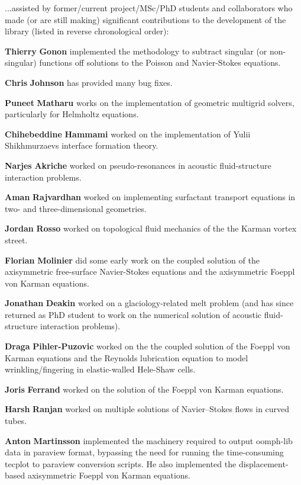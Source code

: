 ...assisted by former/current project/\+M\+Sc/\+PhD students and collaborators who made (or are still making) significant contributions to the development of the library (listed in reverse chronological order)\+:
\begin{DoxyItemize}
\item {\bfseries Thierry} {\bfseries Gonon} implemented the methodology to subtract singular (or non-\/singular) functions off solutions to the Poisson and Navier-\/\+Stokes equations.
\item {\bfseries Chris} {\bfseries Johnson} has provided many bug fixes.
\item {\bfseries Puneet} {\bfseries Matharu} works on the implementation of geometric multigrid solvers, particularly for Helmholtz equations.
\item {\bfseries Chihebeddine} {\bfseries Hammami} worked on the implementation of Yulii Shikhmurzaev\textquotesingle{}s interface formation theory.
\item {\bfseries Narjes} {\bfseries Akriche} worked on pseudo-\/resonances in acoustic fluid-\/structure interaction problems.
\item {\bfseries Aman} {\bfseries Rajvardhan} worked on implementing surfactant transport equations in two-\/ and three-\/dimensional geometries.
\item {\bfseries Jordan} {\bfseries Rosso} worked on topological fluid mechanics of the the Karman vortex street.
\item {\bfseries Florian} {\bfseries Molinier} did some early work on the coupled solution of the axisymmetric free-\/surface Navier-\/\+Stokes equations and the axisymmetric Foeppl von Karman equations.
\item {\bfseries Jonathan} {\bfseries Deakin} worked on a glaciology-\/related melt problem (and has since returned as PhD student to work on the numerical solution of acoustic fluid-\/structure interaction problems).
\item {\bfseries Draga} {\bfseries Pihler-\/\+Puzovic} worked on the the coupled solution of the Foeppl von Karman equations and the Reynolds lubrication equation to model wrinkling/fingering in elastic-\/walled Hele-\/\+Shaw cells.
\item {\bfseries Joris} {\bfseries Ferrand} worked on the solution of the Foeppl von Karman equations.
\item {\bfseries Harsh} {\bfseries Ranjan} worked on multiple solutions of Navier--Stokes flows in curved tubes.
\item {\bfseries Anton} {\bfseries Martinsson} implemented the machinery required to output {\ttfamily oomph-\/lib} data in paraview format, bypassing the need for running the time-\/consuming tecplot to paraview conversion scripts. He also implemented the displacement-\/based axisymmetric Foeppl von Karman equations.

\end{DoxyItemize}
